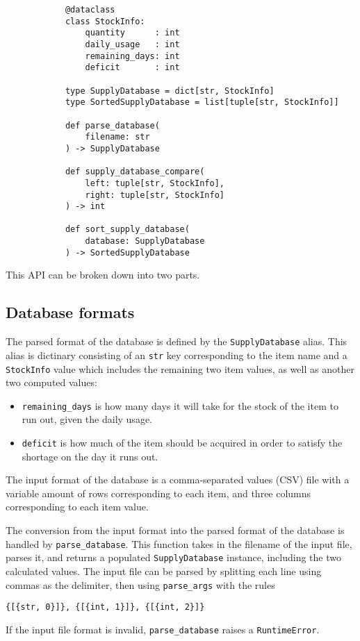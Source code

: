 \documentclass{article}
\begin{document}
		\begin{verbatim}
			@dataclass
			class StockInfo:
				quantity      : int
				daily_usage   : int
				remaining_days: int
				deficit       : int

			type SupplyDatabase = dict[str, StockInfo]
			type SortedSupplyDatabase = list[tuple[str, StockInfo]]

			def parse_database(
				filename: str
			) -> SupplyDatabase

			def supply_database_compare(
				left: tuple[str, StockInfo],
				right: tuple[str, StockInfo]
			) -> int

			def sort_supply_database(
				database: SupplyDatabase
			) -> SortedSupplyDatabase
		\end{verbatim}

		This API can be broken down into two parts.

		\subsection{Database formats}
			The parsed format of the database is defined by the \verb|SupplyDatabase| alias. This
			alias is dictinary consisting of an \verb|str| key corresponding to the item name and a
			\verb|StockInfo| value which includes the remaining two item values, as well as another
			two computed values:

			\begin{itemize}
				\item \verb|remaining_days| is how many days it will take for the stock of the item
				to run out, given the daily usage.
				\item \verb|deficit| is how much of the item should be acquired in order to satisfy
				the shortage on the day it runs out.
			\end{itemize}

			The input format of the database is a comma-separated values (CSV) file with a variable
			amount of rows corresponding to each item, and three columns corresponding to each item
			value.

			The conversion from the input format into the parsed format of the database is handled
			by \verb|parse_database|. This function takes in the filename of the input file, parses
			it, and returns a populated \verb|SupplyDatabase| instance, including the two
			calculated values. The input file can be parsed by splitting each line using commas as
			the delimiter, then using \verb|parse_args| with the rules

			\begin{center}
				\verb|{[{str, 0}]}, {[{int, 1}]}, {[{int, 2}]}|
			\end{center}

			If the input file format is invalid, \verb|parse_database| raises a
			\verb|RuntimeError|.
\end{document}

